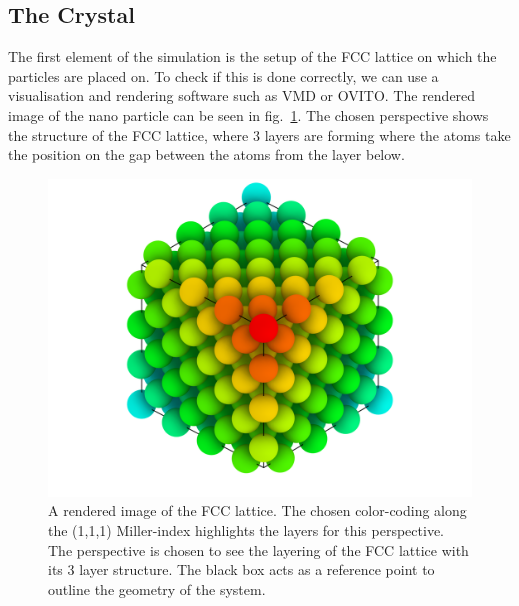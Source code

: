 \documentclass[12pt]{article}
\begin{document}
\subsection{The Crystal}
The first element of the simulation is the setup of the FCC lattice on which the particles are placed on. To check if this is done correctly, we can
use a visualisation and rendering software such as VMD\cite{Humphrey1996} or OVITO\cite{Stukowski2010}. The rendered image of the nano particle 
can be seen in fig.~\ref{fig:glass}. The chosen perspective shows the structure of the FCC lattice, where 3 layers are forming 
where the atoms take the position on the gap between the atoms from the layer below.\\
\begin{figure}[h]
    \begin{center}
        \includegraphics[scale=0.2]{images/fcc_rendering_layer_newcoloring.png}
        \caption{A rendered image of the FCC lattice. The chosen color-coding along the (1,1,1) Miller-index 
                highlights the layers for this perspective. The perspective is
                chosen to see the layering of the FCC lattice with its 3 layer structure. The black box acts as a reference point to outline the 
                geometry of the system.}
        \label{fig:glass}
    \end{center}
\end{figure}
\end{document}
